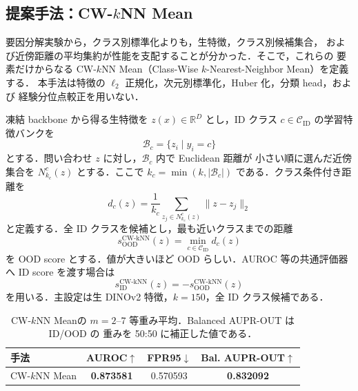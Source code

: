 
\providecommand{\CWKNN}{CW-\(k\)NN Mean}

\subsection{提案手法：\CWKNN}

要因分解実験から，クラス別標準化よりも，生特徴，クラス別候補集合，
および近傍距離の平均集約が性能を支配することが分かった．そこで，これらの
要素だけからなる \CWKNN（Class-Wise \(k\)-Nearest-Neighbor Mean）を定義する．
本手法は特徴の \(\ell_2\) 正規化，次元別標準化，Huber 化，分類 head，および
経験分位点較正を用いない．

凍結 backbone から得る生特徴を \(z(x)\in\mathbb{R}^{D}\) とし，ID クラス
\(c\in\mathcal{C}_{\mathrm{ID}}\) の学習特徴バンクを
\begin{equation}
  \mathcal{B}_{c}=\{z_i\mid y_i=c\}
\end{equation}
とする．問い合わせ \(z\) に対し，\(\mathcal{B}_{c}\) 内で Euclidean 距離が
小さい順に選んだ近傍集合を \(N_{k_c}^{c}(z)\) とする．ここで
\(k_c=\min(k,|\mathcal{B}_{c}|)\) である．クラス条件付き距離を
\begin{equation}
  d_c(z)
  =\frac{1}{k_c}
   \sum_{z_j\in N_{k_c}^{c}(z)}\lVert z-z_j\rVert_2
  \label{eq:cwknn-class-distance}
\end{equation}
と定義する．全 ID クラスを候補とし，最も近いクラスまでの距離
\begin{equation}
  s_{\mathrm{OOD}}^{\mathrm{CW\text{-}kNN}}(z)
  =\min_{c\in\mathcal{C}_{\mathrm{ID}}}d_c(z)
  \label{eq:cwknn-ood-score}
\end{equation}
を OOD score とする．値が大きいほど OOD らしい．AUROC 等の共通評価器へ
ID score を渡す場合は
\begin{equation}
  s_{\mathrm{ID}}^{\mathrm{CW\text{-}kNN}}(z)
  =-s_{\mathrm{OOD}}^{\mathrm{CW\text{-}kNN}}(z)
\end{equation}
を用いる．主設定は生 DINOv2 特徴，\(k=150\)，全 ID クラス候補である．

\begin{table}[t]
  \centering
  \caption{\CWKNN の \(m=2\)--7 等重み平均．Balanced AUPR-OUT は ID/OOD の
  重みを 50:50 に補正した値である．}
  \label{tab:cwknn-main}
  \begin{tabular}{lccc}
    \toprule
    手法 & AUROC$\uparrow$ & FPR95$\downarrow$ & Bal. AUPR-OUT$\uparrow$ \\
    \midrule
    \CWKNN & \textbf{0.873581} & 0.570593 & \textbf{0.832092} \\
    \bottomrule
  \end{tabular}
\end{table}

